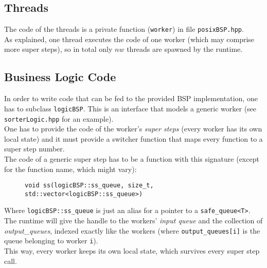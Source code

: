 \documentclass[]{article}
\def\code#1{\texttt{#1}}
\begin{document}
\subsection{Threads}
The code of the threads is a private function (\code{worker}) in file \code{posixBSP.hpp}. \\
As explained, one thread executes the code of one worker (which may comprise more super steps), so in total only $\mathit{nw}$ threads are spawned by the runtime.


\subsection{Business Logic Code}
\label{sec:business}
In order to write code that can be fed to the provided BSP implementation, one has to subclass \code{logicBSP}. This is an interface that models a generic worker (see \code{sorterLogic.hpp} for an example). \\
One has to provide the code of the worker's \emph{super steps} (every worker has its own local state) and it must provide a switcher function that maps every function to a super step number. \\
The code of a generic super step has to be a function with this signature (except for the function name, which might vary): 
\begin{figure}[H]
	\centering
	\begin{minipage}{0.9\textwidth}		
		\code{void ss(logicBSP::ss\_queue, size\_t, std::vector<logicBSP::ss\_queue>)}
	\end{minipage}
\end{figure}
Where \code{logicBSP::ss\_queue} is just an alias for a pointer to a \code{safe\_queue<T>}. The runtime will give the handle to the workers' \emph{input queue} and the collection of \emph{output\_queues}, indexed exactly like the workers (where \code{output\_queues[i]} is the queue belonging to worker \code{i}). \\
This way, every worker keeps its own local state, which survives every super step call.
\end{document}
